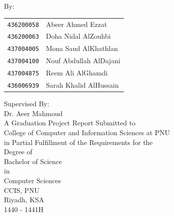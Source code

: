 \documentclass[12pt, oneside, a4paper]{book}
\begin{document}
	

	\begin{titlepage}
	\begin{center}
		\hspace{0pt}\\
		\vspace{4cm}
		{}\\			
			\vspace{2cm}
			By: \\
			\begin{table}[H]
				\begin{center}
					\begin{tabular}{rl}		
						\texttt{436200058} & Abeer Ahmed Ezzat 
						\\
						\texttt{436200063} & Doha Nidal AlZouhbi
						\\
						\texttt{437004005} & Mona Saud AlKhathlan  
						\\
						\texttt{437004100} & Nouf Abdullah AlDajani 
						\\	
						\texttt{437004875} & Reem Ali AlGhamdi
						\\
						\texttt{436006939} & Sarah Khalid AlHussain 
					\end{tabular}
				\end{center}
			\end{table}
			
			Supervised By: \\
			\Large{Dr. Aeer Mahmoud}\\
			
			
			
			\vfill \normalsize
			A Graduation Project Report Submitted to \\
			College of Computer and Information Sciences at PNU \\
			in Partial Fulfillment of the Requirements for the \\
			Degree of \\
			Bachelor of Science \\
			in \\
			Computer Sciences \\[5ex]
			CCIS, PNU \\
			Riyadh, KSA \\
			1440 - 1441H \\
		\end{center}
	\end{titlepage}
	\newpage
\end{document}
